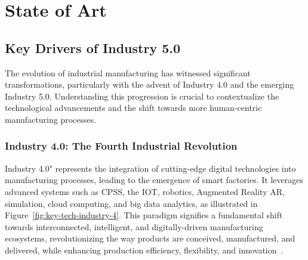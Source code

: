 \chapter{State of Art}%
\label{chapter:stateofart}



\section{Key Drivers of Industry 5.0}
\label{section:industry-evolution}

The evolution of industrial manufacturing has witnessed significant transformations, particularly with the advent of Industry 4.0 and the emerging Industry 5.0. Understanding this progression is crucial to contextualize the technological advancements and the shift towards more human-centric manufacturing processes.

\subsection{Industry 4.0: The Fourth Industrial Revolution}

Industry 4.0" represents the integration of cutting-edge digital technologies into manufacturing processes, leading to the emergence of smart factories. It leverages advanced systems such as \ac{CPSS}, the \ac{IOT}, robotics, Augmented Reality \ac{AR}, simulation, cloud computing, and big data analytics, as illustrated in Figure~\ref{fig:key-tech-industry-4}. This paradigm signifies a fundamental shift towards interconnected, intelligent, and digitally-driven manufacturing ecosystems, revolutionizing the way products are conceived, manufactured, and delivered, while enhancing production efficiency, flexibility, and innovation~\cite{Moller2022, Ahmed2022}.

